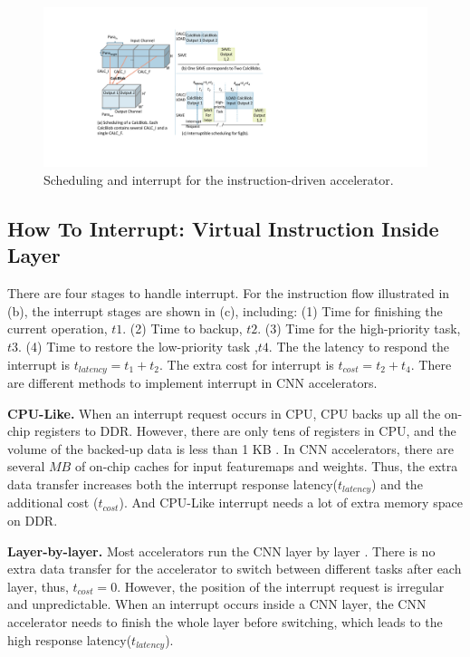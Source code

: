 \begin{figure}[t]
 \centering
 \vspace{-0.1cm} 
 \setlength{\abovecaptionskip}{0cm} 
 \setlength{\belowcaptionskip}{-0.4cm} 
	\includegraphics[width=1.04\linewidth]{fig/singlesave.pdf} 	
 \caption{
		Scheduling and interrupt for the instruction-driven accelerator.
 }
	\label{fig:singlesave}
\end{figure}

\subsection{How To Interrupt: Virtual Instruction Inside Layer}
\label{sec:howinter}

There are four stages to handle interrupt. For the instruction flow illustrated in (b), the interrupt stages are shown in (c), including: (1) Time for finishing the current operation, $t1$. (2) Time to backup, $t2$. (3) Time for the high-priority task, $t3$. (4) Time to restore the low-priority task ,$t4$. The the latency to respond the interrupt is $t_{latency} = t_1+t_2$. The extra cost for interrupt is $t_{cost}=t_2+t_4$. 
There are different methods to implement interrupt in CNN accelerators.

\textbf{CPU-Like.}
When an interrupt request occurs in CPU, CPU backs up all the on-chip registers to DDR. However, there are only tens of registers in CPU, and the volume of the backed-up data is less than 1 KB \cite{furber2000arm}. In CNN accelerators, there are several $MB$ of on-chip caches \cite{qiu2016going, guo2017angel} for input featuremaps and weights. 
Thus, the extra data transfer increases both the interrupt response latency($t_{latency}$) and the additional cost ($t_{cost}$). And CPU-Like interrupt needs a lot of extra memory space on DDR.

\textbf{Layer-by-layer.}
Most accelerators run the CNN layer by layer \cite{qiu2016going,guo2017angel}. 
There is no extra data transfer for the accelerator to switch between different tasks after each layer, thus, $t_{cost}=0$. 
However, the position of the interrupt request is irregular and unpredictable. When an interrupt occurs inside a CNN layer, the CNN accelerator needs to finish the whole layer before switching, which leads to the high response latency($t_{latency}$).

